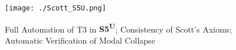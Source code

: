 \documentclass{article}
\newcommand{\logic}[1]{\textbf{#1}\xspace}
\newcommand{\SFiveU}{\logic{S5\textsuperscript{U}}}
\begin{document}


\begin{figure}[t]
\centerline{\texttt{[image: ./Scott\_S5U.png]}}
\caption{Full Automation of T3 in \SFiveU; Consistency of Scott's
  Axioms;  Automatic Verification of Modal Collapse} \label{Scott_S5U}
\end{figure}

\end{document}
